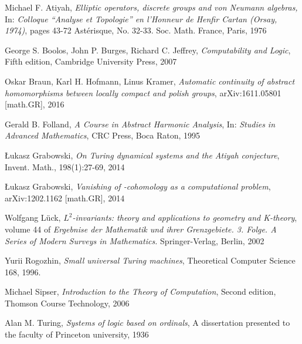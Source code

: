 \begin{thebibliography}{1}

	Michael F. Atiyah,
	\emph{Elliptic operators, discrete groups and von Neumann algebras,}
	In: \emph{Colloque ``Analyse et Topologie'' en l'Honneur de Henfir Cartan (Orsay, 1974)},
	pages 43-72 Ast\'erisque,
	No. 32-33. Soc. Math. France,
	Paris,
	1976

	George S. Boolos, John P. Burges, Richard C. Jeffrey,
	\emph{Computability and Logic},
	Fifth edition,
	Cambridge University Press,
	2007

	Oskar Braun, Karl H. Hofmann, Linus Kramer,
	\emph{Automatic continuity of abstract homomorphisms between locally compact and polish groups},
	arXiv:1611.05801 [math.GR],
	2016

	Gerald B. Folland,
	\emph{A Course in Abstract Harmonic Analysis},
	In: \emph{Studies in Advanced Mathematics},
	CRC Press,
	Boca Raton,
	1995

	\L{}ukasz Grabowski,
	\emph{On Turing dynamical systems and the Atiyah conjecture},
	Invent. Math., 198(1):27-69,
	2014

	\L{}ukasz Grabowski,
	\emph{Vanishing of \ltwo-cohomology as a computational problem},
	arXiv:1202.1162 [math.GR],
	2014

	Wolfgang L\"uck,
	\emph{$L^2$-invariants: theory and applications to geometry and K-theory},
	volume 44 of \emph{Ergebnise der Mathematik und ihrer Grenzgebiete. 3. Folge. A Series of Modern Surveys in Mathematics.}
	Springer-Verlag, Berlin,
	2002

	Yurii Rogozhin,
	\emph{Small universal Turing machines},
	Theoretical Computer Science 168,
	1996.

	Michael Sipser,
	\emph{Introduction to the Theory of Computation},
	Second edition,
	Thomson Course Technology,
	2006

	Alan M. Turing,
	\emph{Systems of logic based on ordinals},
	A dissertation presented to the faculty of Princeton university,
	1936

\end{thebibliography}
